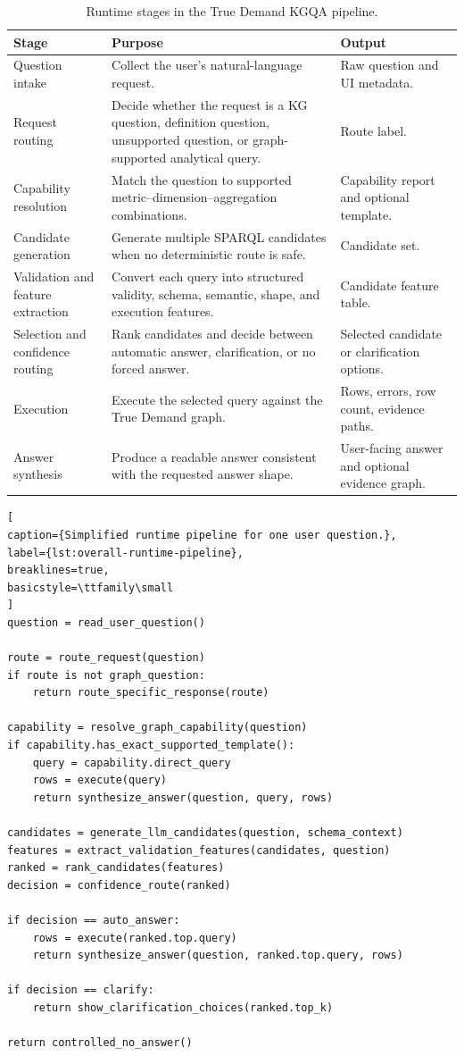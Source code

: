 \documentclass[
  12pt,
  english,
  oneside]{report}
\begin{document}
\begin{table}[htbp]
\centering
\caption{Runtime stages in the True Demand KGQA pipeline.}
\label{tab:runtime-stages}
\small
\begin{tabularx}{\textwidth}{
>{\raggedright\arraybackslash}p{3.2cm}
>{\raggedright\arraybackslash}p{5.2cm}
>{\raggedright\arraybackslash}X
}
\toprule
\textbf{Stage} & \textbf{Purpose} & \textbf{Output} \\
\midrule
Question intake & Collect the user's natural-language request. & Raw question and UI metadata. \\
Request routing & Decide whether the request is a KG question, definition question, unsupported question, or graph-supported analytical query. & Route label. \\
Capability resolution & Match the question to supported metric--dimension--aggregation combinations. & Capability report and optional template. \\
Candidate generation & Generate multiple SPARQL candidates when no deterministic route is safe. & Candidate set. \\
Validation and feature extraction & Convert each query into structured validity, schema, semantic, shape, and execution features. & Candidate feature table. \\
Selection and confidence routing & Rank candidates and decide between automatic answer, clarification, or no forced answer. & Selected candidate or clarification options. \\
Execution & Execute the selected query against the True Demand graph. & Rows, errors, row count, evidence paths. \\
Answer synthesis & Produce a readable answer consistent with the requested answer shape. & User-facing answer and optional evidence graph. \\
\bottomrule
\end{tabularx}
\end{table}

\begin{lstlisting}[
caption={Simplified runtime pipeline for one user question.},
label={lst:overall-runtime-pipeline},
breaklines=true,
basicstyle=\ttfamily\small
]
question = read_user_question()

route = route_request(question)
if route is not graph_question:
    return route_specific_response(route)

capability = resolve_graph_capability(question)
if capability.has_exact_supported_template():
    query = capability.direct_query
    rows = execute(query)
    return synthesize_answer(question, query, rows)

candidates = generate_llm_candidates(question, schema_context)
features = extract_validation_features(candidates, question)
ranked = rank_candidates(features)
decision = confidence_route(ranked)

if decision == auto_answer:
    rows = execute(ranked.top.query)
    return synthesize_answer(question, ranked.top.query, rows)

if decision == clarify:
    return show_clarification_choices(ranked.top_k)

return controlled_no_answer()
\end{lstlisting}
\end{document}
